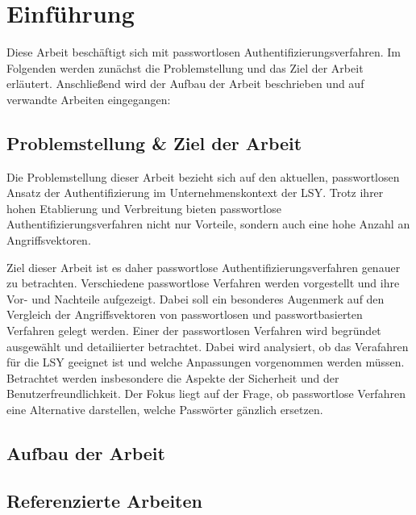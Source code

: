 \chapter{Einführung}
Diese Arbeit beschäftigt sich mit passwortlosen Authentifizierungsverfahren. Im Folgenden werden zunächst die Problemstellung und das Ziel der Arbeit erläutert. Anschließend wird der Aufbau der Arbeit beschrieben und auf verwandte Arbeiten eingegangen:

\section{Problemstellung \& Ziel der Arbeit}
Die Problemstellung dieser Arbeit bezieht sich auf den aktuellen, passwortlosen Ansatz der Authentifizierung im Unternehmenskontext der \ac{LSY}. Trotz ihrer hohen Etablierung und Verbreitung bieten passwortlose Authentifizierungsverfahren nicht nur Vorteile, sondern auch eine hohe Anzahl an Angriffsvektoren. 

Ziel dieser Arbeit ist es daher passwortlose Authentifizierungsverfahren genauer zu betrachten. Verschiedene passwortlose Verfahren werden vorgestellt und ihre Vor- und Nachteile aufgezeigt. Dabei soll ein besonderes Augenmerk auf den Vergleich der Angriffsvektoren von passwortlosen und passwortbasierten Verfahren gelegt werden. Einer der passwortlosen Verfahren wird begründet ausgewählt und detailiierter betrachtet. Dabei wird analysiert, ob das Verafahren für die \ac{LSY} geeignet ist und welche Anpassungen vorgenommen werden müssen. Betrachtet werden insbesondere die Aspekte der Sicherheit und der Benutzerfreundlichkeit. Der Fokus liegt auf der Frage, ob passwortlose Verfahren eine Alternative darstellen, welche Passwörter gänzlich ersetzen. 

\section{Aufbau der Arbeit}

\section{Referenzierte Arbeiten}